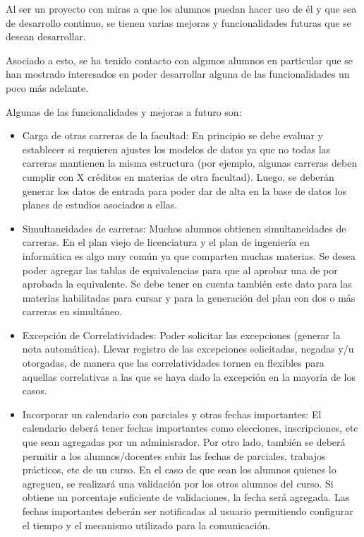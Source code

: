 \documentclass[a4paper]{article}
\begin{document}
Al ser un proyecto con miras a que los alumnos puedan hacer uso de él y que sea de desarrollo continuo, se tienen varias mejoras y funcionalidades futuras que se desean desarrollar.

Asociado a esto, se ha tenido contacto con algunos alumnos en particular que se han mostrado interesados en poder desarrollar alguna de las funcionalidades un poco más adelante.

Algunas de las funcionalidades y mejoras a futuro son:

\begin{itemize}
	\item Carga de otras carreras de la facultad: En principio se debe evaluar y establecer si requieren ajustes los modelos de datos ya que no todas las carreras mantienen la misma estructura (por ejemplo, algunas carreras deben cumplir con X créditos en materias de otra facultad). Luego, se deberán generar los datos de entrada para poder dar de alta en la base de datos los planes de estudios asociados a ellas.
	
	\item Simultaneidades de carreras: Muchos alumnos obtienen simultaneidades de carreras. En el plan viejo de licenciatura y el plan de ingeniería en informática es algo muy común ya que comparten muchas materias. Se desea poder agregar las tablas de equivalencias para que al aprobar una de por aprobada la equivalente. Se debe tener en cuenta también este dato para las materias habilitadas para cursar y para la generación del plan con dos o más carreras en simultáneo.
	
	\item Excepción de Correlatividades: Poder solicitar las excepciones (generar la nota automática). Llevar registro de las excepciones solicitadas, negadas y/u otorgadas, de manera que las correlatividades tornen en flexibles para aquellas correlativas a las que se haya dado la excepción en la mayoría de los casos.
	
	\item Incorporar un calendario con parciales y otras fechas importantes: El calendario deberá tener fechas importantes como elecciones, inscripciones, etc que sean agregadas por un adminisrador. Por otro lado, también se deberá permitir a los alumnos/docentes subir las fechas de parciales, trabajos prácticos, etc de un curso. En el caso de que sean los alumnos quienes lo agreguen, se realizará una validación por los otros alumnos del curso. Si obtiene un porcentaje suficiente de validaciones, la fecha será agregada. Las fechas importantes deberán ser notificadas al usuario permitiendo configurar el tiempo y el mecanismo utilizado para la comunicación.
	

\end{itemize}
\end{document}
